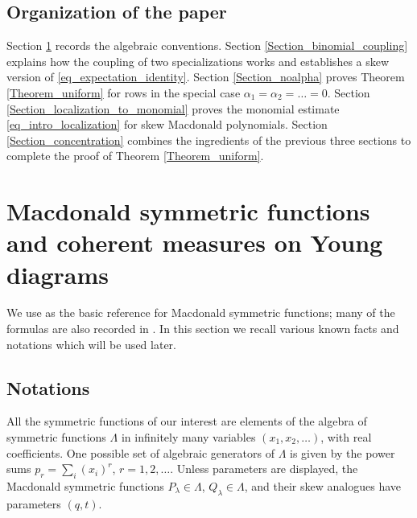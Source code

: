 \documentclass[11pt,reqno]{amsart}
\theoremstyle{definition}
\theoremstyle{remark}
\numberwithin{equation}{section}
\begin{document}
\subsection{Organization of the paper}
Section \ref{sec:preliminaries} records the algebraic conventions. Section \ref{Section_binomial_coupling} explains how the coupling of two specializations works and establishes a skew version of \eqref{eq_expectation_identity}. Section \ref{Section_noalpha} proves Theorem \ref{Theorem_uniform} for rows in the special case $\alpha_1=\alpha_2=\dots=0$.
Section \ref{Section_localization_to_monomial} proves the monomial estimate \eqref{eq_intro_localization} for skew Macdonald polynomials.
Section \ref{Section_concentration} combines the ingredients of the previous three sections to complete the proof of Theorem \ref{Theorem_uniform}.

\section{Macdonald symmetric functions and coherent measures on Young diagrams}\label{sec:preliminaries}

We use \cite[Chapter~VI]{Mac95} as the basic reference for Macdonald
symmetric functions; many of the formulas are also recorded in \cite[Chapter 2]{BC14}. In this section we recall various known facts and notations which will be used later.

\subsection{Notations}\label{sec:identities}
All the symmetric functions of our interest are elements of the algebra of symmetric functions $\Lambda$ in infinitely many variables $(x_1,x_2,\dots)$, with real coefficients. One possible set of algebraic generators of $\Lambda$ is given by the power sums $p_r=\sum_i (x_i)^r$, $r=1,2,\dots$.  Unless parameters
are displayed, the Macdonald symmetric functions $P_\lambda\in\Lambda$, $Q_\lambda\in\Lambda$, and their skew analogues have
parameters $(q,t)$. 
\end{document}
